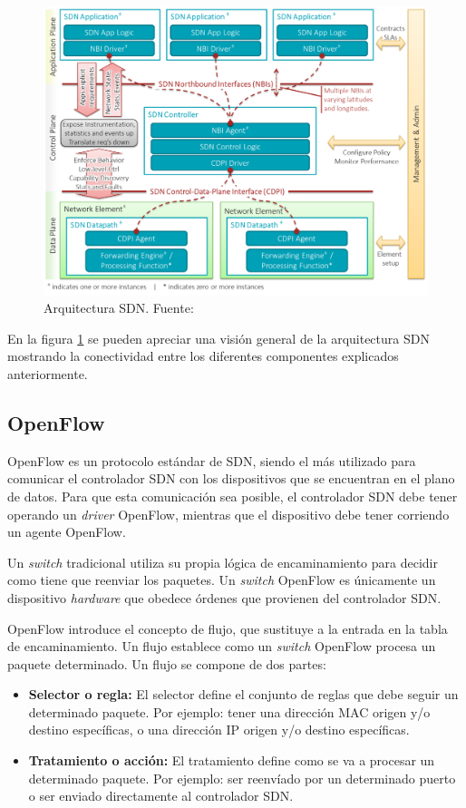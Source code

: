 \begin{figure}[!ht]
	\centering
	\includegraphics[width=0.75\linewidth]{imagenes/arquitectura_sdn}
	\caption{Arquitectura SDN. Fuente:\cite{sdnbib}}
	\label{fig:arquitecturasdn}
\end{figure}

En la figura \ref{fig:arquitecturasdn} se pueden apreciar una visión general de la arquitectura \ac{SDN} mostrando la conectividad entre los diferentes componentes explicados anteriormente.


\subsection{OpenFlow}
\label{subsec:openflow}

OpenFlow\cite{openflowbib} es un protocolo estándar de \ac{SDN}, siendo el más utilizado para comunicar el controlador \ac{SDN} con los dispositivos que se encuentran en el plano de datos. Para que esta comunicación sea posible, el controlador \ac{SDN} debe tener operando un \textit{driver} OpenFlow, mientras que el dispositivo debe tener corriendo un agente OpenFlow. 

Un \textit{switch} tradicional utiliza su propia lógica de encaminamiento para decidir como tiene que reenviar los paquetes. Un \textit{switch} OpenFlow es únicamente un dispositivo \textit{hardware} que obedece órdenes que provienen del controlador \ac{SDN}.

OpenFlow introduce el concepto de flujo, que sustituye a la entrada en la tabla de encaminamiento. Un flujo establece como un \textit{switch} OpenFlow procesa un paquete determinado. Un flujo se compone de dos partes:

\begin{itemize}
	\item \textbf{Selector o regla:} El selector define el conjunto de reglas que debe seguir un determinado paquete. Por ejemplo: tener una dirección MAC origen y/o destino específicas, o una dirección \ac{IP} origen y/o destino específicas. 
	
	\item \textbf{Tratamiento o acción:} El tratamiento define como se va a procesar un determinado paquete. Por ejemplo: ser reenvíado por un determinado puerto o ser enviado directamente al controlador \ac{SDN}.
\end{itemize}
	
